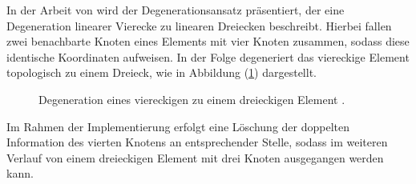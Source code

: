 In der Arbeit von \cite{Zienkiewicz2013} wird der Degenerationsansatz präsentiert, der  eine Degeneration linearer Vierecke zu linearen Dreiecken beschreibt.
Hierbei fallen zwei benachbarte Knoten eines Elements mit vier Knoten zusammen, sodass diese identische Koordinaten aufweisen. In der Folge degeneriert das viereckige Element topologisch zu einem Dreieck, wie in Abbildung (\ref{fig:Degeneration}) dargestellt.
\begin{figure}[H]
	\hspace*{28mm}
	
	\caption{Degeneration eines viereckigen zu einem dreieckigen Element \citep{Zienkiewicz2013}.}
	\label{fig:Degeneration}
\end{figure}
Im Rahmen der Implementierung erfolgt eine Löschung der doppelten Information des vierten Knotens an entsprechender Stelle, sodass im weiteren Verlauf von einem dreieckigen Element mit drei Knoten ausgegangen werden kann.


